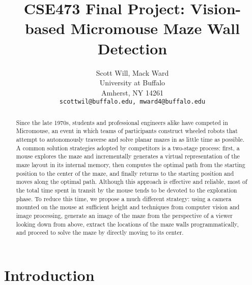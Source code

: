 \documentclass[10pt,twocolumn,letterpaper]{article}
\begin{document}
\title{CSE473 Final Project: Vision-based Micromouse Maze Wall Detection}

\author{Scott Will, Mack Ward\\
University at Buffalo\\
Amherst, NY 14261\\
{\tt\small scottwil@buffalo.edu, mward4@buffalo.edu}
}

\maketitle

\begin{abstract}
	Since the late 1970s, students and professional engineers alike have competed in Micromouse, an event in which teams
	of participants construct wheeled robots that attempt to autonomously traverse and solve planar mazes in as little
	time as possible.  A common solution strategies adopted by competitors is a two-stage process: first, a mouse
	explores the maze and incrementally generates a virtual representation of the maze layout in its internal memory,
	then computes the optimal path from the starting position to the center of the maze, and finally returns to the
	starting position and moves along the optimal path.  Although this approach is effective and reliable, most of the
	total time spent in transit by the mouse tends to be devoted to the exploration phase.  To reduce this time, we
	propose a much different strategy: using a camera mounted on the mouse at sufficient height and techniques from
	computer vision and image processing, generate an image of the maze from the perspective of a viewer looking down
	from above, extract the locations of the maze walls programmatically, and proceed to solve the maze by directly
	moving to its center.
\end{abstract}

\section{Introduction}
\label{sec:introduction}
\end{document}
